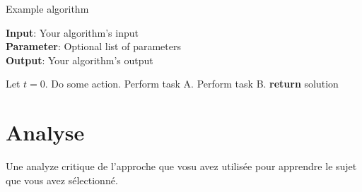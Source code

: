 \documentclass{article}
\begin{document}
\begin{algorithm}[tb]
\caption{Example algorithm}
\label{alg:algorithm}
\textbf{Input}: Your algorithm's input\\
\textbf{Parameter}: Optional list of parameters\\
\textbf{Output}: Your algorithm's output
\begin{algorithmic}[1] %
\STATE Let $t=0$.
\STATE Do some action.
\STATE Perform task A.
\ELSE
\STATE Perform task B.
\ENDIF
\ENDWHILE
\STATE \textbf{return} solution
\end{algorithmic}
\end{algorithm}

\section{Analyse}

Une analyze critique de l'approche que vosu avez utilisée pour apprendre le sujet que vous avez sélectionné.




\end{document}
